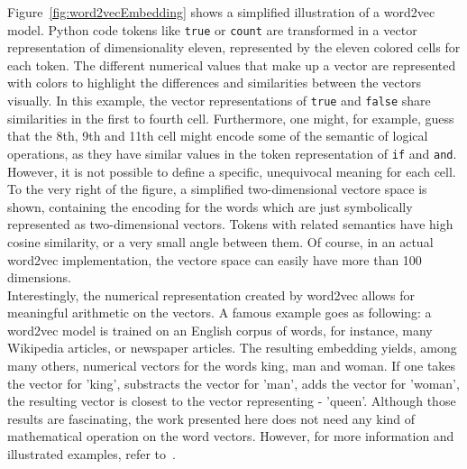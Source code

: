 \documentclass[
a4paper,
pagesize,
pdftex,
12pt,
ngerman,
fleqn,
final,
]{scrartcl}
\begin{document}
	Figure~\ref{fig:word2vecEmbedding} shows a simplified illustration of a word2vec model. Python code tokens like \texttt{true} or \texttt{count} are transformed in a vector representation of dimensionality eleven, represented by the eleven colored cells for each token. The different numerical values that make up a vector are represented with colors to highlight the differences and similarities between the vectors visually. In this example, the vector representations of \texttt{true} and \texttt{false} share similarities in the first to fourth cell. Furthermore, one might, for example, guess that the 8th, 9th and 11th cell might encode some of the semantic of logical operations, as they have similar values in the token representation of \texttt{if} and \texttt{and}. However, it is not possible to define a specific, unequivocal meaning for each cell.\\
	To the very right of the figure, a simplified two-dimensional vectore space is shown, containing the encoding for the words which are just symbolically represented as two-dimensional vectors. Tokens with related semantics have high cosine similarity, or a very small angle between them. Of course, in an actual word2vec implementation, the vectore space can easily have more than 100 dimensions.\\
	Interestingly, the numerical representation created by word2vec allows for meaningful arithmetic on the vectors. A famous example goes as following: a word2vec model is trained on an English corpus of words, for instance, many Wikipedia articles, or newspaper articles. The resulting embedding yields, among many others, numerical vectors for the words king, man and woman. If one takes the vector for 'king', substracts the vector for 'man', adds the vector for 'woman', the resulting vector is closest to the vector representing - 'queen'. Although those results are fascinating, the work presented here does not need any kind of mathematical operation on the word vectors. However, for more information and illustrated examples, refer to~\cite{Word2Vec}.
	
\end{document}
